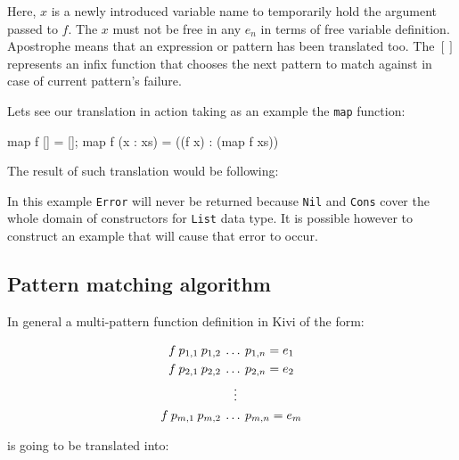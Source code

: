 \documentclass[12pt,a4paper]{report}
\begin{document}
Here, $x$ is a newly introduced variable name to temporarily hold the argument
passed to $f$. The $x$ must not be free in any $e_{n}$ in terms of free
variable definition. Apostrophe means that an expression or pattern has been
translated too. The $[]$ represents an infix function that chooses the next
pattern to match against in case of current pattern's failure.

Lets see our translation in action taking as an example the \texttt{map}
function:

\vspace*{0.2in}
\begin{code}[label=lst:map_pattern_matching,style=haskell]
map f [] = [];
map f (x : xs) = ((f x) : (map f xs))
\end{code}

The result of such translation would be following:

\vspace*{0.2in}

In this example \texttt{Error} will never be returned because \texttt{Nil} and
\texttt{Cons} cover the whole domain of constructors for \texttt{List} data type.  It
is possible however to construct an example that will cause that error to
occur.

\subsection{Pattern matching algorithm}
\label{sec:pattern_matching_algorithm}

In general a multi-pattern function definition in Kivi of the form:

\vspace{-0.2in}
\begin{align*}
f\:p_{1,1}\:p_{1,2}\:&\ldots\:p_{1,n} = e_{1} \\
f\:p_{2,1}\:p_{2,2}\:&\ldots\:p_{2,n} = e_{2} \\
                     &\mathrel{\makebox[\widthof{\ldots}]{\vdots}} \\
f\:p_{m,1}\:p_{m,2}\:&\ldots\:p_{m,n} = e_{m} \\
\end{align*}

is going to be translated into:
\end{document}
